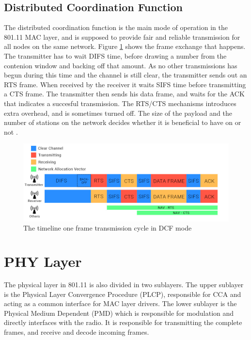 	\subsection{Distributed Coordination Function}
	The distributed coordination function is the main mode of operation in the 801.11 MAC layer, and is supposed to provide fair and reliable 
	transmission for all nodes on the same network. Figure \ref{fig:dcfmode} shows the 
	frame exchange that happens. The transmitter has to wait DIFS time, before drawing 
	a number from the contenion window and backing off that amount.
	As no other transmissions has begun during this time and the channel is
	still clear, the transmitter sends out an RTS frame. When received by the receiver
	it waits SIFS time before transmitting a CTS frame. The transmitter then sends his
	data frame, and waits for the ACK that indicates a succesful transmission. The 
	RTS/CTS mechanisms introduces extra overhead, and is sometimes turned off. The
	size of the payload and the number of stations on the network decides
	whether it is beneficial to have on or not \cite{DCFanalysis}.



	\begin{figure}
	\center
	\includegraphics[scale=0.35]{Images/DCF.jpg}
	\caption{The timeline one frame transmission cycle in DCF mode}
	\label{fig:dcfmode}
	\end{figure}



	\section{PHY Layer}
	The physical layer in 801.11 is also divided in two sublayers. The upper sublayer is the Physical Layer Convergence Procedure (PLCP), responsible for CCA and acting
	as a common interface for MAC layer drivers. The lower sublayer is the Physical Medium Dependent (PMD) which is responsible for modulation and directly interfaces with
	the radio. It is responsible for transmitting the complete frames, and receive
	and decode incoming frames. 

